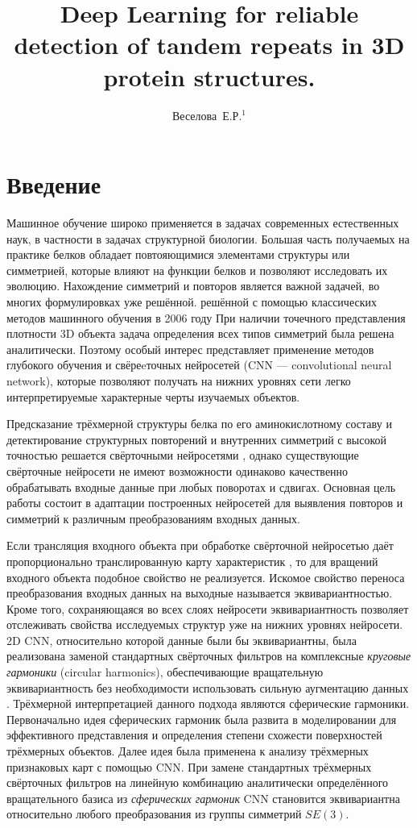 \documentclass[12pt,twosides]{article}
\title
[Detection of tandem repeats in proteins]
{Deep Learning for reliable detection of tandem repeats in 3D protein structures.}
\author
[Веселова~Е.Р.] 
{Веселова~Е.Р.$^1$}
\begin{document}
	\maketitle
	
	\section{Введение}
	Машинное обучение широко применяется в задачах современных естественных наук, в частности в задачах структурной биологии. Большая часть получаемых на практике белков обладает повтояющимися элементами структуры или симметрией, которые влияют на функции белков и позволяют исследовать их эволюцию. Нахождение симметрий и повторов является важной задачей, во многих формулировках уже решённой. решённой с помощью классических методов машинного обучения в 2006 году \cite{MitGuiPau06}
	При наличии точечного представления плотности 3D объекта задача определения всех типов симметрий была решена аналитически.
	Поэтому особый интерес представляет применение методов глубокого обучения и свёреeточных нейросетей (CNN --- convolutional neural network), которые позволяют получать на нижних уровнях сети легко интерпретируемые характерные черты изучаемых объектов. 
	
	Предсказание трёхмерной структуры белка по его аминокислотному составу \cite{BioCNN18} и детектирование структурных повторений и внутренних симметрий с высокой точностью решается свёрточными нейросетями \cite{DeepSymmetry18}, однако существующие свёрточные нейросети не имеют возможности одинаково качественно обрабатывать входные данные при любых поворотах и сдвигах. Основная цель работы состоит в адаптации построенных нейросетей для выявления повторов и симметрий к различным преобразованиям входных данных. 
	
	Если трансляция входного объекта при обработке свёрточной нейросетью даёт пропорционально транслированную карту характеристик \cite{Lenc18}, то для вращений входного объекта подобное свойство не реализуется. Искомое свойство переноса преобразования входных данных на выходные называется эквивариантностью. Кроме того, сохраняющаяся во всех слоях нейросети эквивариантность позволяет отслеживать свойства исследуемых структур уже на нижних уровнях нейросети. 2D CNN, относительно которой данные были бы эквивариантны, была реализована заменой стандартных свёрточных фильтров на комплексные \textit{круговые гармоники} (circular harmonics), обеспечивающие вращательную эквивариантность без необходимости использовать сильную аугментацию данных \cite{conf/cvpr/WorrallGTB17}. Трёхмерной интерпретацией данного подхода являются сферические гармоники. Первоначально идея сферических гармоник была развита в моделировании для эффективного представления и определения степени схожести поверхностей трёхмерных объектов\cite{conf/siggraph/KazhdanF02, journals/cagd/MousaCAG08}. Далее идея была применена к анализу трёхмерных признаковых карт с помощью CNN. При замене стандартных трёхмерных свёрточных фильтров на линейную комбинацию аналитически определённого вращательного базиса из \textit{сферических гармоник} CNN становится эквивариантна относительно любого преобразования из группы симметрий $SE(3)$\cite{DBLP:journals/corr/abs-1807-02547}.
	
\end{document}
